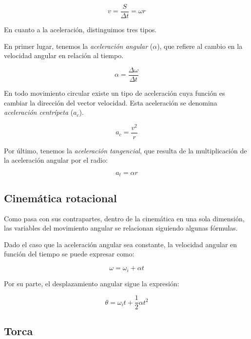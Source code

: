 \documentclass[12pt]{article}
\begin{document}
\begin{equation}
	v = \frac{S}{\Delta t} = \omega r
\end{equation}

En cuanto a la aceleración, distinguimos tres tipos.

En primer lugar,
tenemos la \textit{aceleración angular} (\(\alpha\)),
que refiere al cambio en la velocidad angular en relación al tiempo.

\begin{equation}
	\alpha = \frac{\Delta\omega}{\Delta t}
\end{equation}

En todo movimiento circular existe un tipo de aceleración cuya función es cambiar la dirección del vector velocidad.
Esta aceleración se denomina \textit{aceleración centrípeta} (\(a_{c}\)).

\begin{equation}
	a_{c} = \frac{v^{2}}{r}
\end{equation}

Por último,
tenemos la \textit{aceleración tangencial},
que resulta de la multiplicación de la aceleración angular por el radio:

\begin{equation}
	a_{t} = \alpha r
\end{equation}

\subsection{Cinemática rotacional}

Como pasa con sus contrapartes,
dentro de la cinemática en una sola dimensión,
las variables del movimiento angular se relacionan siguiendo algunas fórmulas.

Dado el caso que la aceleración angular sea constante, 
la velocidad angular en función del tiempo se puede expresar como:

\begin{equation}
	\omega = \omega_{i} + \alpha t
\end{equation}

Por su parte,
el desplazamiento angular sigue la expresión:

\begin{equation}
	\theta = \omega_{i}t + \frac{1}{2}\alpha t^{2}
\end{equation}

\subsection{Torca}
\end{document}
